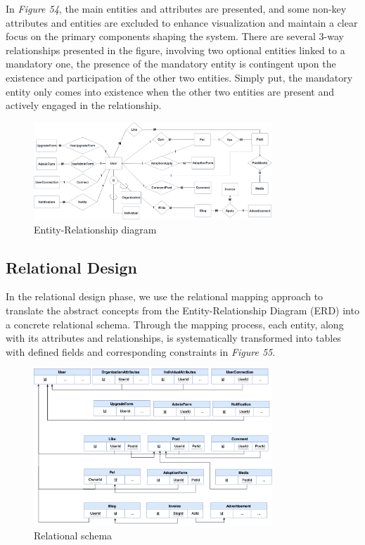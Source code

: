 In \emph{Figure 54}, the main entities and attributes are presented, and
some non-key attributes and entities are excluded to enhance
visualization and maintain a clear focus on the primary components
shaping the system. There are several 3-way relationships presented in
the figure, involving two optional entities linked to a mandatory one,
the presence of the mandatory entity is contingent upon the existence
and participation of the other two entities. Simply put, the mandatory
entity only comes into existence when the other two entities are present
and actively engaged in the relationship.

\begin{figure}[H]
    \centering
    \includegraphics[width=0.8\textwidth]{Figures/DatabaseDesign/Entities-ERD.png}
    \caption{Entity-Relationship diagram}
\end{figure}
\clearpage

\subsection{Relational Design}

In the relational design phase, we use the relational mapping approach
to translate the abstract concepts from the Entity-Relationship Diagram
(ERD) into a concrete relational schema. Through the mapping process,
each entity, along with its attributes and relationships, is
systematically transformed into tables with defined fields and
corresponding constraints in \emph{Figure 55}.

\begin {figure}[H]
\centering
\includegraphics[width=0.8\textwidth]{Figures/DatabaseDesign/Entities-Mapping.png}
\caption{Relational schema}
\end{figure}

